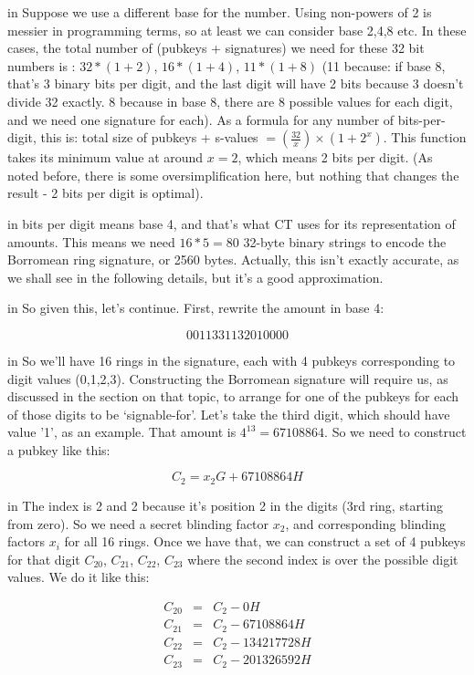 \documentclass[10pt,a4paper]{article}
\begin{document}
 in \noindent Suppose we use a different base for the number. Using non-powers of 2 is messier in programming terms, so at least we can consider base 2,4,8 etc. In these cases, the total number of (pubkeys + signatures) we need for these 32 bit numbers is : $32*(1+2)$, $16*(1+4)$, $11*(1+8)$ (11 because: if base 8, that's 3 binary bits per digit, and the last digit will have 2 bits because 3 doesn't divide 32 exactly. 8 because in base 8, there are 8 possible values for each digit, and we need one signature for each). As a formula for any number of bits-per-digit, this is: total size of pubkeys + s-values $= \left(\frac{32}{x}\right) \times \left(1 + 2^x\right)$. This function takes its minimum value at around $x=2$, which means 2 bits per digit. (As noted before, there is some oversimplification here, but nothing that changes the result - 2 bits per digit is optimal).

 in  bits per digit means base 4, and that's what CT uses for its representation of amounts. This means we need $16*5 = 80$ 32-byte binary strings to encode the Borromean ring signature, or 2560 bytes. Actually, this isn't exactly accurate, as we shall see in the following details, but it's a good approximation.

 in \noindent So given this, let's continue. First, rewrite the amount in base 4:

\[ 0011331132010000 \]

 in \noindent So we'll have 16 rings in the signature, each with 4 pubkeys corresponding to digit values (0,1,2,3). Constructing the Borromean signature will require us, as discussed in the section on that topic, to arrange for one of the pubkeys for each of those digits to be `signable-for'. Let's take the third digit, which should have value '1', as an example. That amount is $4^{13} = 67108864$. So we need to construct a pubkey like this:

\[C_{2} = x_{2}G + 67108864H \]

 in \noindent The index is 2 and 2 because it's position 2 in the digits (3rd ring, starting from zero). So we need a secret blinding factor $x_{2}$, and corresponding blinding factors $x_{i}$ for all 16 rings. Once we have that, we can construct a set of 4 pubkeys for that digit $C_{20}$, $C_{21}$, $C_{22}$, $C_{23}$ where the second index is over the possible digit values. We do it like this:

\begin{eqnarray*}
C_{20} &=& C_{2} - 0H \\
C_{21} &=& C_{2} - 67108864H \\
C_{22} &=& C_{2} - 134217728H \\
C_{23} &=& C_{2} - 201326592H
\end{eqnarray*}
\end{document}

